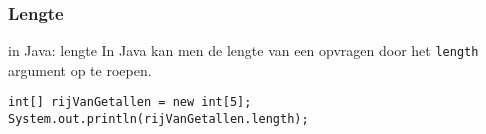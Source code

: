 \subsubsection{Lengte}
\begin{frame}[fragile]{\dsarray{} in Java: lengte}
In Java kan men de lengte van een \dsarray{} opvragen door het \texttt{length} argument op te roepen.
\begin{example}
\begin{lstlisting}
int[] rijVanGetallen = new int[5];
System.out.println(rijVanGetallen.length);
\end{lstlisting}
\end{example}
\end{frame}